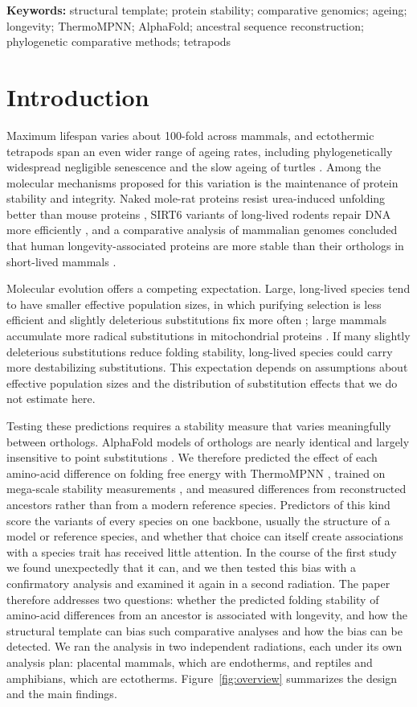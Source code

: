 \documentclass[11pt]{article}
\begin{document}
\noindent\textbf{Keywords:} structural template; protein stability; comparative genomics; ageing; longevity; ThermoMPNN; AlphaFold; ancestral sequence reconstruction; phylogenetic comparative methods; tetrapods

\section{Introduction}
Maximum lifespan varies about 100-fold across mammals, and ectothermic tetrapods span an even wider range of ageing rates, including phylogenetically widespread negligible senescence \citep{Reinke2022} and the slow ageing of turtles \citep{daSilva2022}. Among the molecular mechanisms proposed for this variation is the maintenance of protein stability and integrity. Naked mole-rat proteins resist urea-induced unfolding better than mouse proteins \citep{Perez2009}, SIRT6 variants of long-lived rodents repair DNA more efficiently \citep{Tian2019}, and a comparative analysis of mammalian genomes concluded that human longevity-associated proteins are more stable than their orthologs in short-lived mammals \citep{Farre2021}.

Molecular evolution offers a competing expectation. Large, long-lived species tend to have smaller effective population sizes, in which purifying selection is less efficient and slightly deleterious substitutions fix more often \citep{Ohta1973}; large mammals accumulate more radical substitutions in mitochondrial proteins \citep{Popadin2007}. If many slightly deleterious substitutions reduce folding stability, long-lived species could carry more destabilizing substitutions. This expectation depends on assumptions about effective population sizes and the distribution of substitution effects that we do not estimate here.

Testing these predictions requires a stability measure that varies meaningfully between orthologs. AlphaFold models of orthologs are nearly identical and largely insensitive to point substitutions \citep{Buel2022,Pak2023}. We therefore predicted the effect of each amino-acid difference on folding free energy with ThermoMPNN \citep{Dieckhaus2024}, trained on mega-scale stability measurements \citep{Tsuboyama2023}, and measured differences from reconstructed ancestors rather than from a modern reference species. Predictors of this kind score the variants of every species on one backbone, usually the structure of a model or reference species, and whether that choice can itself create associations with a species trait has received little attention. In the course of the first study we found unexpectedly that it can, and we then tested this bias with a confirmatory analysis and examined it again in a second radiation. The paper therefore addresses two questions: whether the predicted folding stability of amino-acid differences from an ancestor is associated with longevity, and how the structural template can bias such comparative analyses and how the bias can be detected. We ran the analysis in two independent radiations, each under its own analysis plan: placental mammals, which are endotherms, and reptiles and amphibians, which are ectotherms. Figure~\ref{fig:overview} summarizes the design and the main findings.
\end{document}
